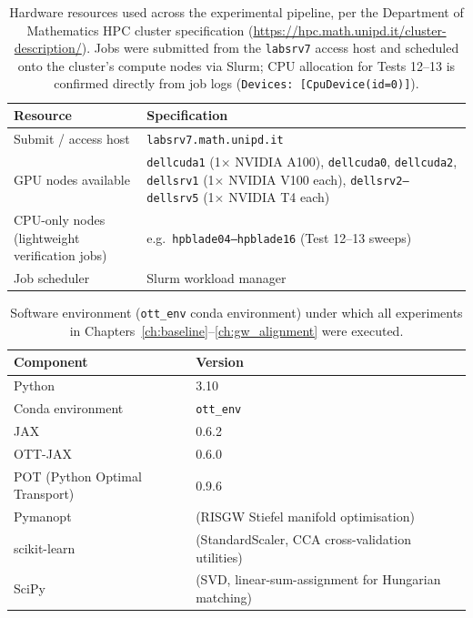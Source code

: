 \begin{table}[H]
\centering
\small
\begin{tabularx}{\textwidth}{lX}
\toprule
\textbf{Resource} & \textbf{Specification} \\
\midrule
Submit / access host & \texttt{labsrv7.math.unipd.it} \\
GPU nodes available & \texttt{dellcuda1} (1$\times$ NVIDIA A100), \texttt{dellcuda0}, \texttt{dellcuda2}, \texttt{dellsrv1} (1$\times$ NVIDIA V100 each), \texttt{dellsrv2--dellsrv5} (1$\times$ NVIDIA T4 each) \\
CPU-only nodes (lightweight verification jobs) & e.g.\ \texttt{hpblade04--hpblade16} (Test 12--13 sweeps) \\
Job scheduler & Slurm workload manager \\
\bottomrule
\end{tabularx}
\caption{Hardware resources used across the experimental pipeline, per
the Department of Mathematics HPC cluster specification
(\url{https://hpc.math.unipd.it/cluster-description/}). Jobs were
submitted from the \texttt{labsrv7} access host and scheduled onto the
cluster's compute nodes via Slurm; CPU allocation for Tests 12--13 is
confirmed directly from job logs (\texttt{Devices: [CpuDevice(id=0)]}).}
\label{tab:app_hw}
\end{table}

\begin{table}[H]
\centering
\small
\begin{tabularx}{\textwidth}{lX}
\toprule
\textbf{Component} & \textbf{Version} \\
\midrule
Python                          & 3.10 \\
Conda environment               & \texttt{ott\_env} \\
JAX                             & 0.6.2 \\
OTT-JAX                         & 0.6.0 \\
POT (Python Optimal Transport)  & 0.9.6 \\
Pymanopt                        & (RISGW Stiefel manifold optimisation) \\
scikit-learn                    & (StandardScaler, CCA cross-validation utilities) \\
SciPy                           & (SVD, linear-sum-assignment for Hungarian matching) \\
\bottomrule
\end{tabularx}
\caption{Software environment (\texttt{ott\_env} conda environment) under
which all experiments in Chapters~\ref{ch:baseline}--\ref{ch:gw_alignment}
were executed.}
\label{tab:app_sw}
\end{table}

